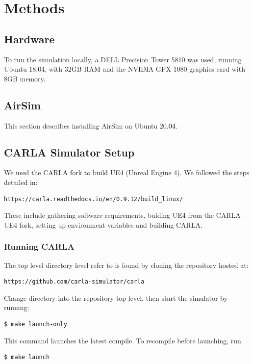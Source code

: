 \chapter{Methods} %
\label{Appendix-methods} 

\section{Hardware}

To run the simulation locally, a DELL Precision Tower 5810 was used, running Ubuntu 18.04, with 32GB RAM and the NVIDIA GPX 1080 graphics card with 8GB memory.

\section{AirSim}

This section describes installing AirSim on Ubuntu 20.04.

\section{CARLA Simulator Setup}

We used the CARLA fork to build UE4 (Unreal Engine 4). We followed the steps detailed in:

\begin{verbatim}
https://carla.readthedocs.io/en/0.9.12/build_linux/
\end{verbatim}

These include gathering software requirements, bulding UE4 from the CARLA UE4 fork, setting up environment variables and building CARLA.

\subsection{Running CARLA}

The top level directory level refer to is found by cloning the repository hosted at:
\begin{verbatim}
https://github.com/carla-simulator/carla
\end{verbatim}


Change directory into the repository top level, then start the simulator by running:
\begin{verbatim}
$ make launch-only
\end{verbatim}
This command launches the latest compile. To recompile before launching, run
\begin{verbatim}
$ make launch
\end{verbatim}

